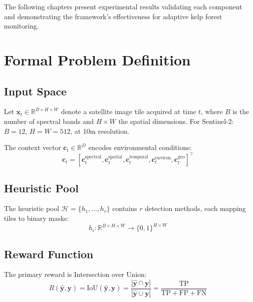 \documentclass[11pt,a4paper]{article}
\begin{document}
The following chapters present experimental results validating each component and demonstrating the framework's effectiveness for adaptive kelp forest monitoring.


\appendix

\section{Formal Problem Definition}
\label{app:formal}

\subsection{Input Space}

Let $\mathbf{x}_t \in \mathbb{R}^{B \times H \times W}$ denote a satellite image tile acquired at time $t$, where $B$ is the number of spectral bands and $H \times W$ the spatial dimensions. For Sentinel-2: $B = 12$, $H = W = 512$, at 10m resolution.

The context vector $\mathbf{c}_t \in \mathbb{R}^D$ encodes environmental conditions:
\begin{equation}
\mathbf{c}_t = \left[ \mathbf{c}^{\text{spectral}}_t, \mathbf{c}^{\text{spatial}}_t, \mathbf{c}^{\text{temporal}}_t, \mathbf{c}^{\text{environ}}_t, \mathbf{c}^{\text{geo}}_t \right]^\top
\end{equation}

\subsection{Heuristic Pool}

The heuristic pool $\mathcal{H} = \{h_1, \ldots, h_r\}$ contains $r$ detection methods, each mapping tiles to binary masks:
\begin{equation}
h_i : \mathbb{R}^{B \times H \times W} \rightarrow \{0, 1\}^{H \times W}
\end{equation}

\subsection{Reward Function}

The primary reward is Intersection over Union:
\begin{equation}
R(\hat{\mathbf{y}}, \mathbf{y}) = \text{IoU}(\hat{\mathbf{y}}, \mathbf{y}) = \frac{|\hat{\mathbf{y}} \cap \mathbf{y}|}{|\hat{\mathbf{y}} \cup \mathbf{y}|} = \frac{\text{TP}}{\text{TP} + \text{FP} + \text{FN}}
\end{equation}
\end{document}
